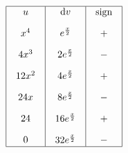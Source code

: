 \[
\begin{array}{|c|c|c|}
\hline
\begin{array}{c}
u \\ [1em]
x^4 \\[1em]
4x^3 \\[1em]
12x^2 \\[1em]
24x \\[1em]
24 \\[1em]
0
\end{array} &
\begin{array}{c}
\mathrm{d}v \\[1em]
e^{\frac{x}{2}} \\[1em]
2e^{\frac{x}{2}} \\[1em]
4e^{\frac{x}{2}} \\[1em]
8e^{\frac{x}{2}} \\[1em]
16e^{\frac{x}{2}} \\[1em]
32e^{\frac{x}{2}}
\end{array} &
\begin{array}{c}
\text{sign} \\[1em]
+ \\[1em]
- \\[1em]
+ \\[1em]
- \\[1em]
+ \\[1em]
-
\end{array} \\
\hline
\end{array}
\]
